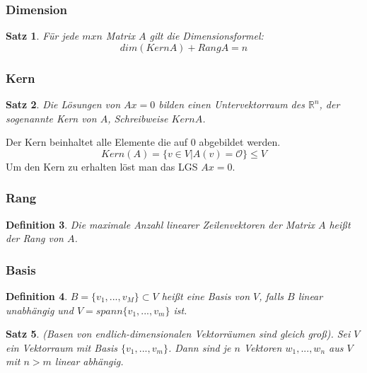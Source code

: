 \documentclass[12pt,a4paper]{article}%
\newtheorem{satz}{Satz}[section]
\newtheorem{definition}[satz]{Definition}
\numberwithin{equation}{section}
\newcommand{\R}{\mathbb{R}} %
\numberwithin{equation}{subsection}
\begin{document}
	  \subsubsection{Dimension}
    \begin{satz}
      Für jede $mxn$ Matrix $A$ gilt die Dimensionsformel: \newline 
      \begin{equation}
      dim(KernA) + RangA = n
      \end{equation}
    \end{satz}	 
    
    \subsubsection{Kern}
    \begin{satz}
      Die Lösungen von $Ax = 0$ bilden einen Untervektorraum des $\R^n$, der sogenannte Kern von $A$, Schreibweise $KernA$.
    \end{satz} 
    Der Kern beinhaltet alle Elemente die auf $0$ abgebildet werden.
    \begin{equation}
      Kern(A) = \lbrace v \in V |A(v) = \mathcal{O}\rbrace \leq V
    \end{equation}
    Um den Kern zu erhalten löst man das LGS $Ax = 0$.
    
	  \subsubsection{Rang}
	  \begin{definition}
	    Die maximale Anzahl linearer Zeilenvektoren der Matrix $A$ heißt der Rang von $A$. 
   \end{definition} 
	  
	  \subsubsection{Basis}
	  \begin{definition}
	    $B = \lbrace v_1,...,v_M\rbrace \subset V$ heißt eine Basis von $V$, falls $B$ linear unabhängig und $V = spann \lbrace v_1,...,v_m \rbrace$ ist.
	  \end{definition}
	 
    \begin{satz}
      \glqq (Basen von endlich-dimensionalen Vektorräumen sind gleich groß).\newline
      Sei $V$ ein Vektorraum mit Basis $\lbrace v_1,...,v_m\rbrace$. Dann sind je $n$ Vektoren $w_1,...,w_n$ aus $V$ mit $n>m$ linear abhängig. \grqq \cite{HM12}
    \end{satz}
     
\end{document}
